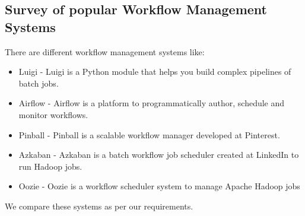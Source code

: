 \documentclass[10pt,onecolumn]{IEEEtran}
\begin{document}
\subsection{Survey of popular Workflow Management Systems}
There are different workflow management systems like:
\begin{itemize}
\item Luigi - Luigi is a Python module that helps you build complex pipelines of batch jobs.
\item Airflow - Airflow is a platform to programmatically author, schedule and monitor workflows.
\item Pinball - Pinball is a scalable workflow manager developed at Pinterest.
\item Azkaban - Azkaban is a batch workflow job scheduler created at LinkedIn to run Hadoop jobs.
\item Oozie - Oozie is a workflow scheduler system to manage Apache Hadoop jobs

\end{itemize}

We compare these systems as per our requirements.
\end{document}
